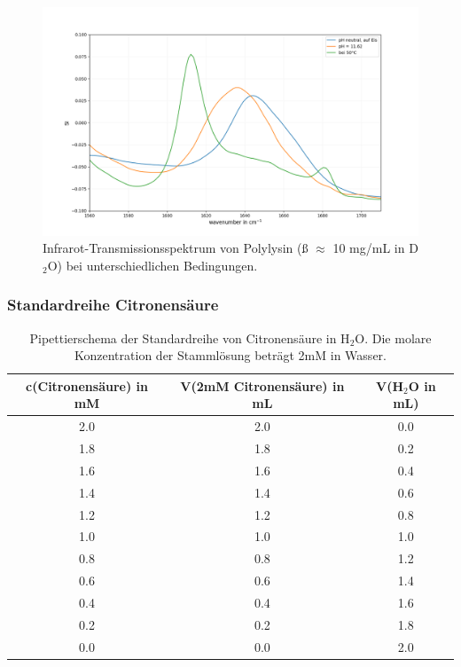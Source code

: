 \documentclass[10pt,a4paper]{article}
\begin{document}
		\begin{figure}[H]
		\centering
		\includegraphics[scale=0.55]{Polylysin.png}
		\caption{Infrarot-Transmissionsspektrum von Polylysin (ß $\approx$ 10 mg/mL in D$_2$O) bei unterschiedlichen Bedingungen.}
		\label{fig:polylysion_IR_Spektrum}
		\end{figure}
	
		\subsubsection{Standardreihe Citronensäure}
			\begin{table}[H]
				\centering
				\caption{Pipettierschema der Standardreihe von Citronensäure in H$_2$O. Die molare Konzentration der Stammlösung beträgt 2mM in Wasser.}
				\label{tab:pipettierschema Standardreihe}
				\begin{tabular}{ccc}
					\toprule
					c(Citronensäure) in mM &V(2mM Citronensäure) in mL & V(H$_2$O in mL)\\
					\midrule
					2.0 & 2.0 & 0.0\\
					1.8 & 1.8 & 0.2\\
					1.6 & 1.6 & 0.4 \\
					1.4 & 1.4 & 0.6 \\
					1.2 & 1.2 & 0.8\\
					1.0 & 1.0 & 1.0 \\
					0.8 & 0.8 & 1.2\\
					0.6 & 0.6 & 1.4\\
					0.4 & 0.4 & 1.6 \\
					0.2 & 0.2 & 1.8 \\
					0.0 & 0.0 & 2.0\\
					\bottomrule
				\end{tabular}
			\end{table}	
	
	
	\nocite{*}
	
	\newpage
	
	
\end{document}
